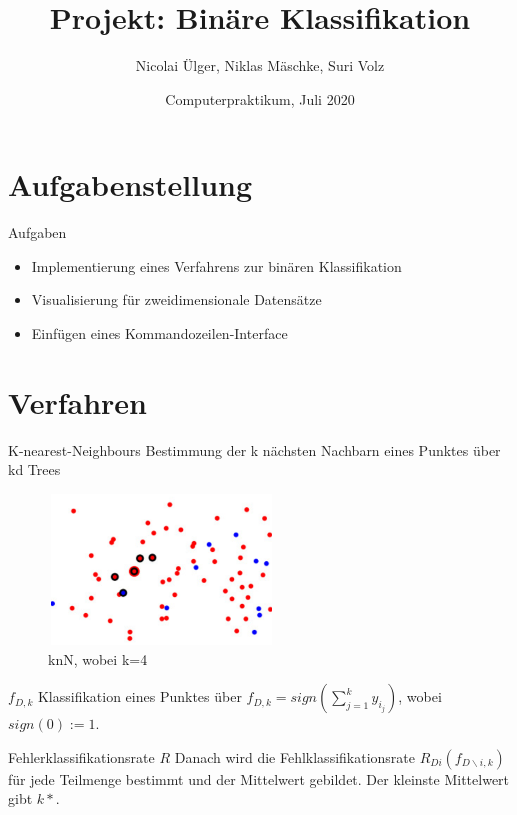\documentclass[12pt,ngerman,a4paper,xcolor={dvipsnames}]{beamer}
\title{Projekt: Binäre Klassifikation}
\author{Nicolai Ülger, Niklas Mäschke, Suri Volz}
\date{Computerpraktikum, Juli 2020}
\begin{document}
\maketitle
\section{Aufgabenstellung}
\begin{frame}{Aufgaben}
	\begin{itemize}
		\item Implementierung eines Verfahrens zur binären Klassifikation
		\item Visualisierung für zweidimensionale Datensätze
		\item Einfügen eines Kommandozeilen-Interface 
	\end{itemize}
	
\end{frame}

\section{Verfahren}


\begin{frame}{K-nearest-Neighbours}
	Bestimmung der k nächsten Nachbarn eines Punktes über kd Trees
	\begin{figure}[h]
		\centering
		\includegraphics[width=6cm, height=4cm]{knn}
		\caption{knN, wobei k=4}
	\end{figure}

\end{frame}
\begin{frame}{$f_{D,k}$}
	Klassifikation eines Punktes über  $f_{D,k}=sign(\sum_{j=1}^{k}y_{i_{j} })$, wobei $sign(0):=1$. 
	
	
	
	
\end{frame}
\begin{frame}{Fehlerklassifikationsrate $R$}
		Danach wird die Fehlklassifikationsrate $R_{Di}(f_{D\backslash i,k})$  für jede Teilmenge bestimmt und der Mittelwert gebildet. Der kleinste Mittelwert gibt $k*$.
\end{frame}
\end{document}
